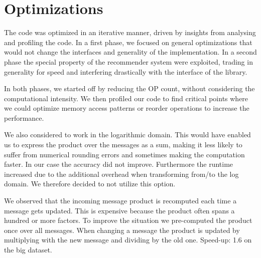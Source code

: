 \section{Optimizations}\label{sec:method}



The code was optimized in an iterative manner, driven by insights from analysing and profiling the code. In a first phase, we focused on general optimizations that would not change the interfaces and generality of the implementation. In a second phase the special property of the recommender system were exploited, trading in generality for speed and interfering drastically with the interface of the library.

In both phases, we started off by reducing the OP count, without considering the computational intensity. We then profiled our code to find critical points where we could optimize memory access patterns or reorder operations to increase the performance.

We also considered to work in the logarithmic domain. This would have enabled us to express the product over the messages as a sum,  making it less likely to suffer from numerical rounding errors and sometimes making the computation faster. In our case the accuracy did not improve. Furthermore the runtime increased due to the additional overhead when transforming from/to the log domain. We therefore decided to not utilize this option.

We observed that the incoming message product is recomputed each time a message gets updated. This is expensive because the product often spans a hundred or more factors. To improve the situation we pre-computed the product once over all messages. When changing a message the product is updated by multiplying with the new message and dividing by the old one. 
Speed-up: 1.6 on the big dataset.

